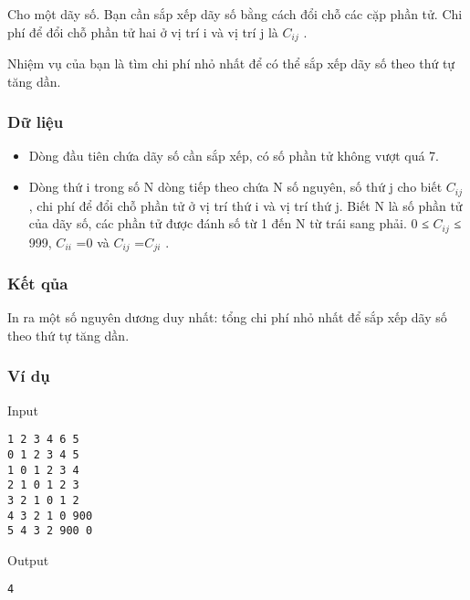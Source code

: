 

Cho một dãy số. Bạn cần sắp xếp dãy số bằng cách đổi chỗ các cặp phần tử. Chi phí để đổi chỗ phần tử hai ở vị trí i và vị trí j là $C_{ij}$ .

Nhiệm vụ của bạn là tìm chi phí nhỏ nhất để có thể sắp xếp dãy số theo thứ tự tăng dần.

\subsubsection{Dữ liệu}
\begin{itemize}
	\item Dòng đầu tiên chứa dãy số cần sắp xếp, có số phần tử không vượt quá 7.
	\item Dòng thứ i trong số N dòng tiếp theo chứa N số nguyên, số thứ j cho biết $C_{ij}$ , chi phí để đổi chỗ phần tử ở vị trí thứ i và vị trí thứ j. Biết N là số phần tử của dãy số, các phần tử được đánh số từ 1 đến N từ trái sang phải. 0 ≤ $C_{ij}$ ≤ 999, $C_{ii}$ =0 và $C_{ij}$ =$C_{ji}$ .
\end{itemize}

\subsubsection{Kết qủa}

In ra một số nguyên dương duy nhất: tổng chi phí nhỏ nhất để sắp xếp dãy số theo thứ tự tăng dần.

\subsubsection{Ví dụ}

Input
\begin{verbatim}
1 2 3 4 6 5
0 1 2 3 4 5
1 0 1 2 3 4
2 1 0 1 2 3
3 2 1 0 1 2
4 3 2 1 0 900
5 4 3 2 900 0\end{verbatim}

Output
\begin{verbatim}
4\end{verbatim}
